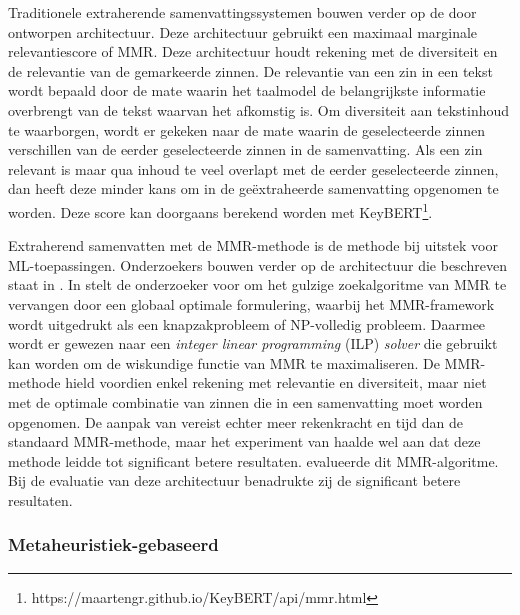 Traditionele extraherende samenvattingssystemen bouwen verder op de door \textcite{Carbonell1998} ontworpen architectuur. Deze architectuur gebruikt een maximaal marginale relevantiescore of MMR. Deze architectuur houdt rekening met de diversiteit en de relevantie van de gemarkeerde zinnen. De relevantie van een zin in een tekst wordt bepaald door de mate waarin het taalmodel de belangrijkste informatie overbrengt van de tekst waarvan het afkomstig is. Om diversiteit aan tekstinhoud te waarborgen, wordt er gekeken naar de mate waarin de geselecteerde zinnen verschillen van de eerder geselecteerde zinnen in de samenvatting. Als een zin relevant is maar qua inhoud te veel overlapt met de eerder geselecteerde zinnen, dan heeft deze minder kans om in de geëxtraheerde samenvatting opgenomen te worden. Deze score kan doorgaans berekend worden met KeyBERT\footnote{https://maartengr.github.io/KeyBERT/api/mmr.html}.

Extraherend samenvatten met de MMR-methode is de methode bij uitstek voor ML-toepassingen. Onderzoekers bouwen verder op de architectuur die beschreven staat in \textcite{Carbonell1998}. In \textcite{McDonald2007} stelt de onderzoeker voor om het gulzige zoekalgoritme van MMR te vervangen door een globaal optimale formulering, waarbij het MMR-framework wordt uitgedrukt als een knapzakprobleem of NP-volledig probleem. Daarmee wordt er gewezen naar een \textit{integer linear programming} (ILP) \textit{solver} die gebruikt kan worden om de wiskundige functie van MMR te maximaliseren. De MMR-methode hield voordien enkel rekening met relevantie en diversiteit, maar niet met de optimale combinatie van zinnen die in een samenvatting moet worden opgenomen. De aanpak van \textcite{McDonald2007} vereist echter meer rekenkracht en tijd dan de standaard MMR-methode, maar het experiment van \textcite{McDonald2007} haalde wel aan dat deze methode leidde tot significant betere resultaten. \textcite{Lin2010} evalueerde dit MMR-algoritme. Bij de evaluatie van deze architectuur benadrukte zij de significant betere resultaten. 

\subsubsection{Metaheuristiek-gebaseerd}

